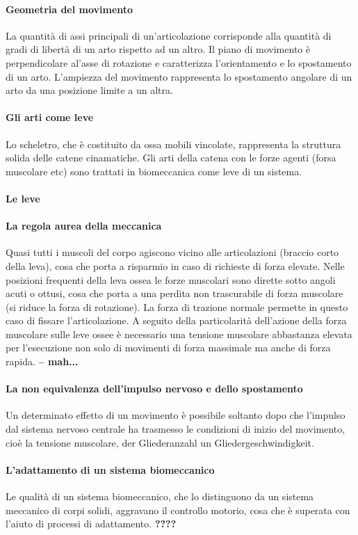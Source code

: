 \paragraph {Geometria del movimento}
La quantit\`a di assi principali di un'articolazione corrisponde
alla quantit\`a di gradi di libert\`a di un arto rispetto ad un altro.
Il piano di movimento \`e perpendicolare al'asse di rotazione
e caratterizza l'orientamento e lo spostamento di un arto.
L'ampiezza del movimento rappresenta lo spostamento angolare
di un arto da una posizione limite a un altra.

\paragraph {Gli arti come leve}
Lo scheletro, che \`e costituito da ossa mobili vincolate,
rappresenta la struttura solida delle catene cinamatiche.
Gli arti della catena con le forze agenti (forsa muscolare etc)
sono trattati in biomeccanica come leve di un sistema.

\paragraph {Le leve}


\paragraph {La regola aurea della meccanica}
Quasi tutti i muscoli del corpo agiscono vicino alle articolazioni (braccio corto della leva),
cosa che porta a risparmio in caso di richieste di forza elevate.
Nelle posizioni frequenti della leva ossea le forze muscolari sono dirette sotto angoli acuti o ottusi,
cosa che porta a una perdita non trascurabile di forza muscolare (si riduce la forza di rotazione).
La forza di trazione normale permette in questo caso di fissare l'articolazione.
A seguito della particolarit\`a dell'azione della forza muscolare sulle leve ossee
\`e necessario una tensione muscolare abbastanza elevata
per l'esecuzione non solo di movimenti di forza massimale ma anche di forza rapida.
\textbf{-- mah...}


\paragraph {La non equivalenza dell'impulso nervoso e dello spostamento}
Un determinato effetto di un movimento \`e possibile soltanto dopo
che l'impulso dal sistema nervoso centrale ha trasmesso
le condizioni di inizio del movimento,
cio\`e la tensione muscolare, der Gliederanzahl un Gliedergeschwindigkeit.

\paragraph {L'adattamento di un sistema biomeccanico}
Le qualit\`a di un sistema biomeccanico,
che lo distinguono da un sistema meccanico di corpi solidi,
aggravano il controllo motorio,
cosa che \`e superata con l'aiuto di processi di adattamento.
\textbf{????}